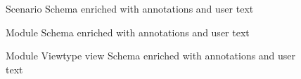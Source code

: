 \begin{figure}[h]
\centering

\caption{Scenario Schema enriched with annotations and user text}
\label{figure:scenarioTemplate2}
\end{figure}

\begin{figure}[h]
\centering

\caption{Module Schema enriched with annotations and user text}
\label{figure:moduleTemplate2}
\end{figure}

\begin{figure}[h]
\centering

\caption{Module Viewtype view Schema enriched with annotations and user text}
\label{figure:viewTemplate2}
\end{figure}
